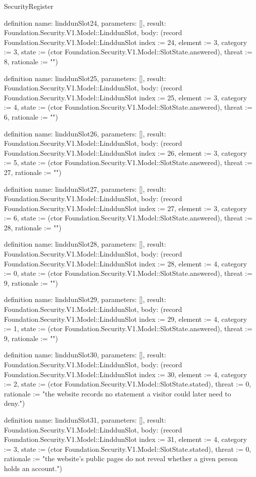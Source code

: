 \begin{lexlean}{SecurityRegister}
\begin{semanticmodule}
definition{
  name: linddunSlot24,
  parameters: [],
  result: Foundation.Security.V1.Model::LinddunSlot,
  body: (record Foundation.Security.V1.Model::LinddunSlot {index := 24, element := 3, category := 3, state := (ctor Foundation.Security.V1.Model::SlotState.answered), threat := 8, rationale := ""})
}

definition{
  name: linddunSlot25,
  parameters: [],
  result: Foundation.Security.V1.Model::LinddunSlot,
  body: (record Foundation.Security.V1.Model::LinddunSlot {index := 25, element := 3, category := 4, state := (ctor Foundation.Security.V1.Model::SlotState.answered), threat := 6, rationale := ""})
}

definition{
  name: linddunSlot26,
  parameters: [],
  result: Foundation.Security.V1.Model::LinddunSlot,
  body: (record Foundation.Security.V1.Model::LinddunSlot {index := 26, element := 3, category := 5, state := (ctor Foundation.Security.V1.Model::SlotState.answered), threat := 27, rationale := ""})
}

definition{
  name: linddunSlot27,
  parameters: [],
  result: Foundation.Security.V1.Model::LinddunSlot,
  body: (record Foundation.Security.V1.Model::LinddunSlot {index := 27, element := 3, category := 6, state := (ctor Foundation.Security.V1.Model::SlotState.answered), threat := 28, rationale := ""})
}

definition{
  name: linddunSlot28,
  parameters: [],
  result: Foundation.Security.V1.Model::LinddunSlot,
  body: (record Foundation.Security.V1.Model::LinddunSlot {index := 28, element := 4, category := 0, state := (ctor Foundation.Security.V1.Model::SlotState.answered), threat := 9, rationale := ""})
}

definition{
  name: linddunSlot29,
  parameters: [],
  result: Foundation.Security.V1.Model::LinddunSlot,
  body: (record Foundation.Security.V1.Model::LinddunSlot {index := 29, element := 4, category := 1, state := (ctor Foundation.Security.V1.Model::SlotState.answered), threat := 9, rationale := ""})
}

definition{
  name: linddunSlot30,
  parameters: [],
  result: Foundation.Security.V1.Model::LinddunSlot,
  body: (record Foundation.Security.V1.Model::LinddunSlot {index := 30, element := 4, category := 2, state := (ctor Foundation.Security.V1.Model::SlotState.stated), threat := 0, rationale := "the website records no statement a visitor could later need to deny."})
}

definition{
  name: linddunSlot31,
  parameters: [],
  result: Foundation.Security.V1.Model::LinddunSlot,
  body: (record Foundation.Security.V1.Model::LinddunSlot {index := 31, element := 4, category := 3, state := (ctor Foundation.Security.V1.Model::SlotState.stated), threat := 0, rationale := "the website's public pages do not reveal whether a given person holds an account."})
}


\end{semanticmodule}
\end{lexlean}
